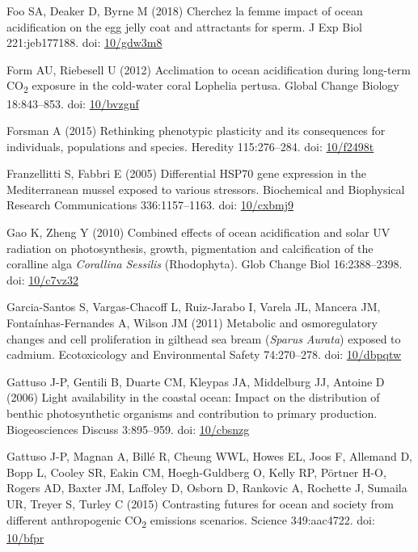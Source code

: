 \documentclass[a4paper,10pt, oneside]{memoir}
\begin{document}
\leavevmode\hypertarget{ref-Foo2018}{}%
Foo SA, Deaker D, Byrne M (2018) Cherchez la femme impact of ocean acidification on the egg jelly coat and attractants for sperm. J Exp Biol 221:jeb177188. doi: \href{https://doi.org/10/gdw3m8}{10/gdw3m8}

\leavevmode\hypertarget{ref-Form2012}{}%
Form AU, Riebesell U (2012) Acclimation to ocean acidification during long-term CO\textsubscript{2} exposure in the cold-water coral Lophelia pertusa. Global Change Biology 18:843--853. doi: \href{https://doi.org/10/bvzgnf}{10/bvzgnf}

\leavevmode\hypertarget{ref-Forsman2015}{}%
Forsman A (2015) Rethinking phenotypic plasticity and its consequences for individuals, populations and species. Heredity 115:276--284. doi: \href{https://doi.org/10/f2498t}{10/f2498t}

\leavevmode\hypertarget{ref-Franzellitti2005}{}%
Franzellitti S, Fabbri E (2005) Differential HSP70 gene expression in the Mediterranean mussel exposed to various stressors. Biochemical and Biophysical Research Communications 336:1157--1163. doi: \href{https://doi.org/10/cxbmj9}{10/cxbmj9}

\leavevmode\hypertarget{ref-Gao2010}{}%
Gao K, Zheng Y (2010) Combined effects of ocean acidification and solar UV radiation on photosynthesis, growth, pigmentation and calcification of the coralline alga \emph{Corallina} \emph{Sessilis} (Rhodophyta). Glob Change Biol 16:2388--2398. doi: \href{https://doi.org/10/c7vz32}{10/c7vz32}

\leavevmode\hypertarget{ref-Garcia-Santos2011}{}%
Garcia-Santos S, Vargas-Chacoff L, Ruiz-Jarabo I, Varela JL, Mancera JM, Fontaínhas-Fernandes A, Wilson JM (2011) Metabolic and osmoregulatory changes and cell proliferation in gilthead sea bream (\emph{Sparus} \emph{Aurata}) exposed to cadmium. Ecotoxicology and Environmental Safety 74:270--278. doi: \href{https://doi.org/10/dbpqtw}{10/dbpqtw}

\leavevmode\hypertarget{ref-Gattuso2006}{}%
Gattuso J-P, Gentili B, Duarte CM, Kleypas JA, Middelburg JJ, Antoine D (2006) Light availability in the coastal ocean: Impact on the distribution of benthic photosynthetic organisms and contribution to primary production. Biogeosciences Discuss 3:895--959. doi: \href{https://doi.org/10/cbsnzg}{10/cbsnzg}

\leavevmode\hypertarget{ref-Gattuso2015}{}%
Gattuso J-P, Magnan A, Billé R, Cheung WWL, Howes EL, Joos F, Allemand D, Bopp L, Cooley SR, Eakin CM, Hoegh-Guldberg O, Kelly RP, Pörtner H-O, Rogers AD, Baxter JM, Laffoley D, Osborn D, Rankovic A, Rochette J, Sumaila UR, Treyer S, Turley C (2015) Contrasting futures for ocean and society from different anthropogenic CO\textsubscript{2} emissions scenarios. Science 349:aac4722. doi: \href{https://doi.org/10/bfpr}{10/bfpr}
\end{document}
